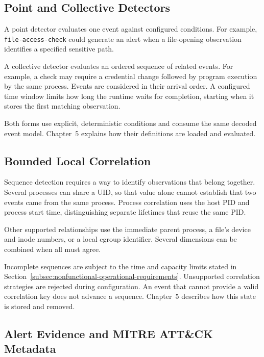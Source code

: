   \subsection{Point and Collective Detectors}
  \label{subsec:point-collective-detectors}

  A point detector evaluates one event against configured conditions.
  For example, \texttt{file-access-check} could generate an alert when a
  file-opening observation identifies a specified sensitive path.

  A collective detector evaluates an ordered sequence of related events.
  For example, a check may require a credential change followed by program
  execution by the same process. Events are considered in their arrival order.
  A configured time window limits how long the runtime waits for completion,
  starting when it stores the first matching observation.

  Both forms use explicit, deterministic conditions and consume the same
  decoded event model. Chapter~5 explains how their definitions are loaded
  and evaluated.

  \subsection{Bounded Local Correlation}
  \label{subsec:bounded-local-correlation}

  Sequence detection requires a way to identify observations that belong
  together. Several processes can share a UID, so that value alone cannot
  establish that two events came from the same process. Process correlation
  uses the host PID and process start time, distinguishing separate lifetimes
  that reuse the same PID.

  Other supported relationships use the immediate parent process, a file's
  device and inode numbers, or a local cgroup identifier. Several dimensions
  can be combined when all must agree.

  Incomplete sequences are subject to the time and capacity limits stated
  in Section~\ref{subsec:nonfunctional-operational-requirements}.
  Unsupported correlation strategies are rejected during configuration.
  An event that cannot provide a valid correlation key does not advance
  a sequence. Chapter~5 describes how this state is stored and removed.

  \subsection{Alert Evidence and MITRE ATT\&CK Metadata}
  \label{subsec:alert-evidence-attack}

